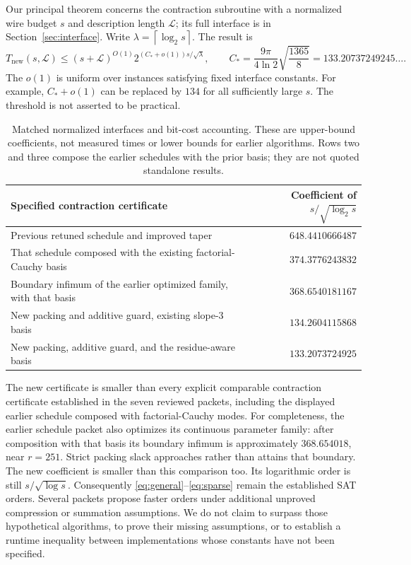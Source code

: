 \documentclass[11pt,letterpaper]{article}
\theoremstyle{definition}\newtheorem{definition}[theorem]{Definition}
\theoremstyle{remark}\newtheorem{remark}[theorem]{Remark}
\newcommand{\LL}{\mathcal L}
\newcommand{\ceil}[1]{\left\lceil#1\right\rceil}
\newcommand{\newconstant}{133.20737249245\ldots}
\begin{document}
Our principal theorem concerns the contraction subroutine with a normalized
wire budget $s$ and description length $\LL$; its full interface is in
Section~\ref{sec:interface}. Write $\lambda=\ceil{\log_2 s}$. The result is
\begin{equation}\label{eq:headline}
 T_{\mathrm{new}}(s,\LL)\le (s+\LL)^{O(1)}
 2^{(C_*+o(1))s/\sqrt\lambda},\qquad
 C_* = \frac{9\pi}{4\ln2}\sqrt{\frac{1365}{8}}
     =\newconstant.
\end{equation}
The $o(1)$ is uniform over instances satisfying fixed interface constants.
For example, $C_*+o(1)$ can be replaced by $134$ for all sufficiently large
$s$. The threshold is not asserted to be practical.

\begin{table}[ht]
\centering\small
\begin{tabularx}{\textwidth}{@{}X r@{}}
\toprule
Specified contraction certificate & Coefficient of $s/\sqrt{\log_2s}$\\
\midrule
Previous retuned schedule and improved taper~\cite{schedulepacket}
 & $648.4410666487$\\
That schedule composed with the existing factorial-Cauchy basis
 & $374.3776243832$\\
Boundary infimum of the earlier optimized family, with that basis
 & $368.6540181167$\\
New packing and additive guard, existing slope-$3$ basis
 & $134.2604115868$\\
New packing, additive guard, and the residue-aware basis
 & $133.2073724925$\\
\bottomrule
\end{tabularx}
\caption{Matched normalized interfaces and bit-cost accounting. These are
upper-bound coefficients, not measured times or lower bounds for earlier
algorithms. Rows two and three compose the earlier schedules with the prior
basis; they are not quoted standalone results.}\label{tab:constants}
\end{table}

The new certificate is smaller than every explicit comparable contraction
certificate established in the seven reviewed packets, including the
displayed earlier schedule composed with factorial-Cauchy modes.
For completeness, the earlier schedule packet also optimizes its
continuous parameter family: after composition with that basis its
boundary infimum is approximately $368.654018$, near $r=251$.
Strict packing slack approaches rather than attains that boundary.
The new coefficient is smaller than this comparison too. Its logarithmic
order is still $s/\sqrt{\log s}$. Consequently
\eqref{eq:general}--\eqref{eq:sparse} remain the established SAT orders.
Several packets propose faster orders under additional unproved compression
or summation assumptions. We do not claim to surpass those hypothetical
algorithms, to prove their missing assumptions, or to establish a runtime
inequality between implementations whose constants have not been specified.
\end{document}
